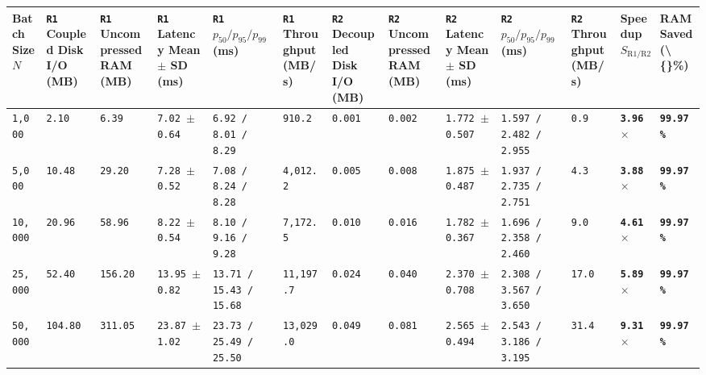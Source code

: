 \documentclass[10pt,a4paper]{article}
\begin{document}
{\scriptsize
\begin{longtable}{p{}p{}p{}p{}p{}p{}p{}p{}p{}p{}p{}p{}p{}}
\toprule
\textbf{Batch Size $N$} & \textbf{\texttt{R1} Coupled Disk I/O (MB)} & \textbf{\texttt{R1} Uncompressed RAM (MB)} & \textbf{\texttt{R1} Latency Mean $\pm$ SD (ms)} & \textbf{\texttt{R1} $p_{50} / p_{95} / p_{99}$ (ms)} & \textbf{\texttt{R1} Throughput (MB/s)} & \textbf{\texttt{R2} Decoupled Disk I/O (MB)} & \textbf{\texttt{R2} Uncompressed RAM (MB)} & \textbf{\texttt{R2} Latency Mean $\pm$ SD (ms)} & \textbf{\texttt{R2} $p_{50} / p_{95} / p_{99}$ (ms)} & \textbf{\texttt{R2} Throughput (MB/s)} & \textbf{Speedup $S_{\text{R1/R2}}$} & \textbf{RAM Saved (\textbackslash\{\}\%)} \\
\midrule
\endhead
\texttt{1,000} & \texttt{2.10} & \texttt{6.39} & \texttt{7.02 $\pm$ 0.64} & \texttt{6.92 / 8.01 / 8.29} & \texttt{910.2} & \texttt{0.001} & \texttt{0.002} & \texttt{1.772 $\pm$ 0.507} & \texttt{1.597 / 2.482 / 2.955} & \texttt{0.9} & \textbf{\texttt{3.96$\times$}} & \textbf{\texttt{99.97\%}} \\
\texttt{5,000} & \texttt{10.48} & \texttt{29.20} & \texttt{7.28 $\pm$ 0.52} & \texttt{7.08 / 8.24 / 8.28} & \texttt{4,012.2} & \texttt{0.005} & \texttt{0.008} & \texttt{1.875 $\pm$ 0.487} & \texttt{1.937 / 2.735 / 2.751} & \texttt{4.3} & \textbf{\texttt{3.88$\times$}} & \textbf{\texttt{99.97\%}} \\
\texttt{10,000} & \texttt{20.96} & \texttt{58.96} & \texttt{8.22 $\pm$ 0.54} & \texttt{8.10 / 9.16 / 9.28} & \texttt{7,172.5} & \texttt{0.010} & \texttt{0.016} & \texttt{1.782 $\pm$ 0.367} & \texttt{1.696 / 2.358 / 2.460} & \texttt{9.0} & \textbf{\texttt{4.61$\times$}} & \textbf{\texttt{99.97\%}} \\
\texttt{25,000} & \texttt{52.40} & \texttt{156.20} & \texttt{13.95 $\pm$ 0.82} & \texttt{13.71 / 15.43 / 15.68} & \texttt{11,197.7} & \texttt{0.024} & \texttt{0.040} & \texttt{2.370 $\pm$ 0.708} & \texttt{2.308 / 3.567 / 3.650} & \texttt{17.0} & \textbf{\texttt{5.89$\times$}} & \textbf{\texttt{99.97\%}} \\
\texttt{50,000} & \texttt{104.80} & \texttt{311.05} & \texttt{23.87 $\pm$ 1.02} & \texttt{23.73 / 25.49 / 25.50} & \texttt{13,029.0} & \texttt{0.049} & \texttt{0.081} & \texttt{2.565 $\pm$ 0.494} & \texttt{2.543 / 3.186 / 3.195} & \texttt{31.4} & \textbf{\texttt{9.31$\times$}} & \textbf{\texttt{99.97\%}} \\

\end{longtable}}
\end{document}
